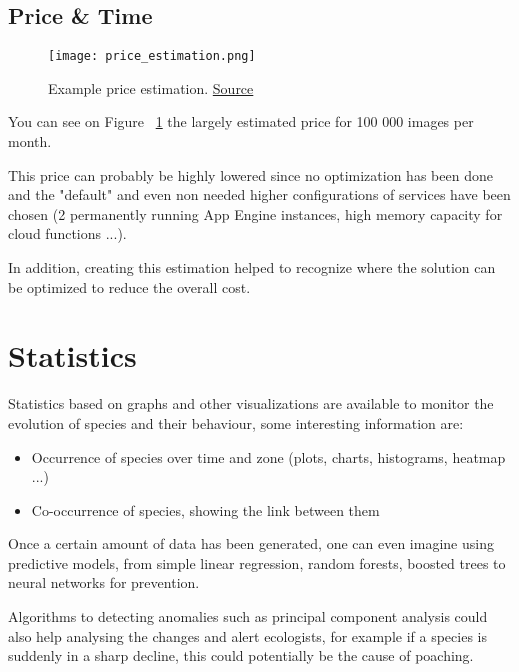 \pagebreak\subsection{Price \& Time}

\begin{figure}[H]
    \centering
    \texttt{[image: price\_estimation.png]}
	\caption{Example price estimation. \href{https://cloud.google.com/products/calculator/\#id=8c3bc8ef-79f9-45da-a7f4-eec8337c3cb5}{Source}}
	\label{fig:priceestimation}
\end{figure}

You can see on Figure ~\ref{fig:priceestimation} the largely estimated price for 100 000 images per month.

This price can probably be highly lowered since no optimization has been done and the "default" and even non needed higher configurations of services have been chosen (2 permanently running App Engine instances, high memory capacity for cloud functions ...).

In addition, creating this estimation helped to recognize where the solution can be optimized to reduce the overall cost.

\pagebreak\section{Statistics}

Statistics based on graphs and other visualizations are available to monitor the evolution of species and their behaviour, some interesting information are:
\begin{itemize}
    \item Occurrence of species over time and zone (plots, charts, histograms, heatmap ...)
    \item Co-occurrence of species, showing the link between them
\end{itemize}

Once a certain amount of data has been generated, one can even imagine using predictive models, from simple linear regression, random forests, boosted trees to neural networks for prevention.

Algorithms to detecting anomalies such as principal component analysis could also help analysing the changes and alert ecologists, for example if a species is suddenly in a sharp decline, this could potentially be the cause of poaching.

